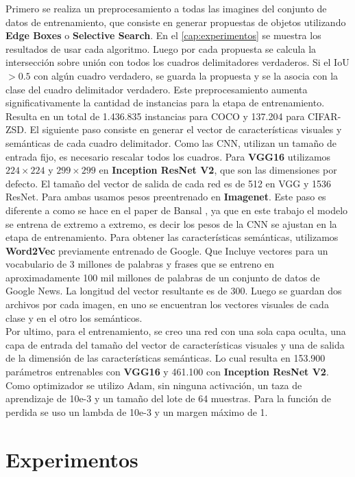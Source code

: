 Primero se realiza un preprocesamiento a todas las imagines del conjunto de datos de entrenamiento, que consiste en generar propuestas de objetos utilizando \textbf{Edge Boxes} o \textbf{Selective Search}. En el \autoref{cap:experimentos} se muestra los resultados de usar cada algoritmo. Luego por cada propuesta se calcula la intersección sobre unión con todos los cuadros delimitadores verdaderos. Si el IoU $> 0.5$ con algún cuadro verdadero, se guarda la propuesta y se la asocia con la clase del cuadro delimitador verdadero. Este preprocesamiento aumenta significativamente la cantidad de instancias para la etapa de entrenamiento. Resulta en un total de 1.436.835 instancias para COCO y 137.204 para CIFAR-ZSD. El siguiente paso consiste en generar el vector de características visuales y semánticas de cada cuadro delimitador. Como las CNN, utilizan un tamaño de entrada fijo, es necesario rescalar todos los cuadros.  Para \textbf{VGG16} utilizamos $224 \times 224$  y $299 \times 299$ en \textbf{Inception ResNet V2}, que son las dimensiones por defecto. El tamaño del vector de salida de cada red es de 512 en VGG y 1536 ResNet. Para ambas usamos pesos preentrenado en \textbf{Imagenet}. Este paso es diferente a como se hace en el paper de Bansal \cite{bansal2018zero}, ya que en este trabajo el modelo se entrena de extremo a extremo, es decir los pesos de la CNN se ajustan en la etapa de entrenamiento. Para obtener las características semánticas, utilizamos \textbf{Word2Vec} previamente entrenado de Google. Que Incluye vectores para un vocabulario de 3 millones de palabras y frases que se entreno en aproximadamente 100 mil millones de palabras de un conjunto de datos de Google News. La longitud del vector resultante es de 300. Luego se guardan dos archivos por cada imagen, en uno se encuentran los vectores visuales de cada clase y en el otro los semánticos.\\

Por ultimo, para el entrenamiento, se creo una red con una sola capa oculta, una capa de entrada del tamaño del vector de características visuales y una de salida de la dimensión de las características semánticas. Lo cual resulta en 153.900 parámetros entrenables con \textbf{VGG16} y 461.100 con \textbf{Inception ResNet V2}. Como optimizador se utilizo Adam, sin ninguna activación, un taza de aprendizaje de 10e-3 y un tamaño del lote de 64 muestras. Para la función de perdida se uso un lambda de 10e-3 y un margen máximo de 1.\\


\section{Experimentos}\label{cap:experimentos}

